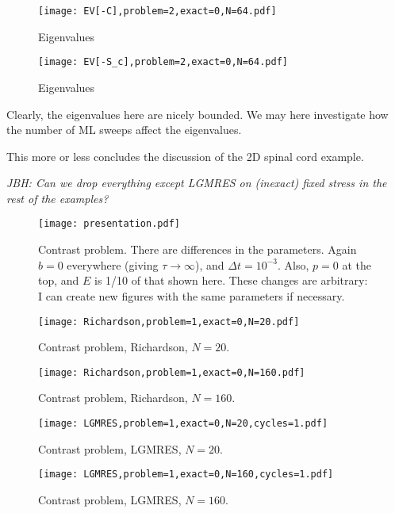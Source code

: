 \documentclass{article}
\begin{document}
\begin{figure}
\begin{center}
\texttt{[image: EV[-C],problem=2,exact=0,N=64.pdf]}
\caption{Eigenvalues} 
\end{center}
\end{figure}


\begin{figure}
\begin{center}
\texttt{[image: EV[-S\_c],problem=2,exact=0,N=64.pdf]}
\caption{Eigenvalues} 
\end{center}
\end{figure}

Clearly, the eigenvalues here are nicely bounded. We may here investigate how 
the number of ML sweeps affect the eigenvalues.  

This more or less concludes the discussion of the 2D spinal cord example. 

\emph{JBH: Can we drop everything except LGMRES on (inexact) fixed stress in the rest of the examples?}

\begin{figure}
\begin{center}
\texttt{[image: presentation.pdf]}
\caption{Contrast problem. There are differences in the parameters. Again $b=0$ everywhere (giving $\tau\rightarrow\infty$), and $\Delta t=10^{-3}$. Also, $p=0$ at the top, and $E$ is 1/10 of that shown here. These changes are arbitrary: I can create new figures with the same parameters if necessary.}
\end{center}
\end{figure}

\begin{figure}
\begin{center}
\texttt{[image: Richardson,problem=1,exact=0,N=20.pdf]}
\caption{Contrast problem, Richardson, $N=20$.}
\end{center}
\end{figure}

\begin{figure}
\begin{center}
\texttt{[image: Richardson,problem=1,exact=0,N=160.pdf]}
\caption{Contrast problem, Richardson, $N=160$.}
\end{center}
\end{figure}

\begin{figure}
\begin{center}
\texttt{[image: LGMRES,problem=1,exact=0,N=20,cycles=1.pdf]}
\caption{Contrast problem, LGMRES, $N=20$.}
\end{center}
\end{figure}

\begin{figure}
\begin{center}
\texttt{[image: LGMRES,problem=1,exact=0,N=160,cycles=1.pdf]}
\caption{Contrast problem, LGMRES, $N=160$.}
\end{center}
\end{figure}
\end{document}
